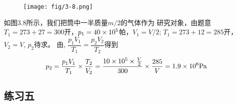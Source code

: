 \begin{enumerate}
\begin{figure}[htp]
    \centering
\texttt{[image: fig/3-8.png]}
    \caption{}
\end{figure}

\begin{solution}
如图3.8所示，我们把筒中一半质量$m/2$的气体作为
    研究对象，由题意$T_1=273+27=300$开，$p_1=40\times10^5$帕，$V_1=V/2$; $T_1=273+12=285$开，$V_2=V$, $p_2$待求。
    由, $\dfrac{p_1V_1}{T_1}=\dfrac{p_2V_2}{T_2}$得到
\[p_2=\frac{p_1V_1}{T_1}\times \frac{T_2}{V_2}=\frac{10\times 10^5\times \frac{V}{2}}{300}\times \frac{285}{V}=1.9\times 10^6{\rm Pa}\]
\end{solution}
\end{enumerate}

\subsection{练习五}

